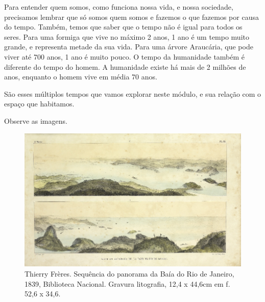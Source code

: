 {

Para entender quem somos, como funciona nossa vida, e nossa sociedade,
precisamos lembrar que só somos quem somos e fazemos o que fazemos por
causa do tempo. Também, temos que saber que o tempo não é igual para
todos os seres. Para uma formiga que vive no máximo 2 anos, 1 ano é um
tempo muito grande, e representa metade da sua vida. Para uma árvore
Araucária, que pode viver até 700 anos, 1 ano é muito pouco. O tempo da
humanidade também é diferente do tempo do homem. A humanidade existe há
mais de 2 milhões de anos, enquanto o homem vive em média 70 anos.

São esses múltiplos tempos que vamos explorar neste módulo, e sua
relação com o espaço que habitamos.}






Observe as imagens.

\begin{figure}[htpb!]
\includegraphics[width=.5\textwidth]{./imgs/img29.jpg}
\caption{Thierry Frères. Sequência do panorama da Baía do Rio de Janeiro, 1839, Biblioteca Nacional. Gravura litografia, 12,4 x 44,6cm em f. 52,6 x 34,6.}
\end{figure}

